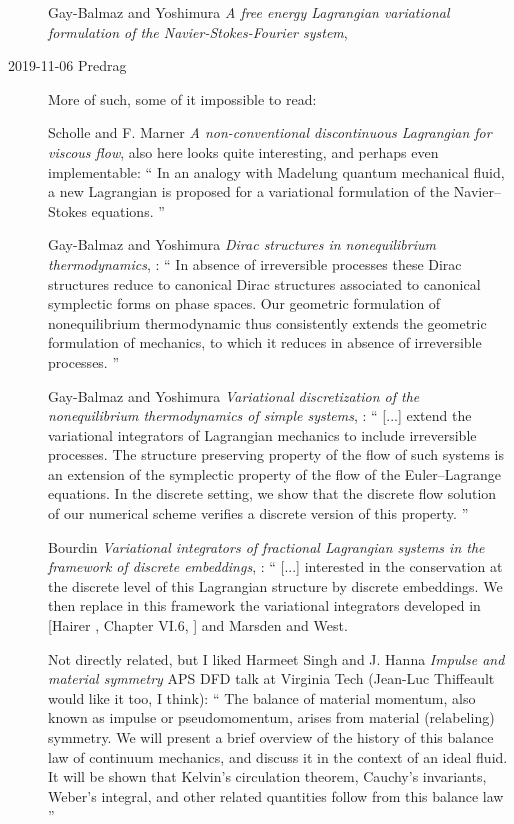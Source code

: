 \begin{description}
Gay-Balmaz and Yoshimura {\em A free energy {Lagrangian}
variational formulation of the {Navier-Stokes-Fourier} system},

\item[2019-11-06 Predrag] More of such, some of it impossible to read:

Scholle and F. Marner
{\em A non-conventional discontinuous {Lagrangian} for viscous flow},
also  {here}
looks quite interesting, and perhaps even implementable: ``
In an analogy with Madelung quantum mechanical fluid, a new Lagrangian is
proposed for a variational formulation of the Navier–Stokes equations.
''


Gay-Balmaz and Yoshimura {\em Dirac structures in nonequilibrium
thermodynamics}, : ``
In absence of irreversible processes these Dirac structures reduce to canonical
Dirac structures associated to canonical symplectic forms on phase spaces. Our
geometric formulation of nonequilibrium thermodynamic thus consistently extends
the geometric formulation of mechanics, to which it reduces in absence of
irreversible processes.
''

Gay-Balmaz and Yoshimura {\em Variational discretization of the
nonequilibrium thermodynamics of simple systems}, : ``
[...] extend the variational integrators of Lagrangian mechanics to include
irreversible processes. The structure preserving property of the flow of such
systems is an extension of the symplectic property of the flow of the
Euler–Lagrange equations. In the discrete setting, we show that the discrete flow
solution of our numerical scheme verifies a discrete version of this property.
''

Bourdin \etal{} {\em Variational integrators of fractional {Lagrangian}
systems in the framework of discrete embeddings},  : ``
[...] interested in the conservation at the discrete level of this Lagrangian
structure by discrete embeddings. We then replace in this framework the
variational integrators developed in [Hairer \etal{}, Chapter VI.6,
] and
Marsden and West.

Not directly related, but
I liked Harmeet Singh and J. Hanna {\em Impulse and material symmetry}
APS DFD talk at Virginia Tech
(Jean-Luc Thiffeault would like it too, I think): ``
The balance of material momentum, also known as impulse or pseudomomentum, arises
from material (relabeling) symmetry. We will present a brief overview of the
history of this balance law of continuum mechanics, and discuss it in the context
of an ideal fluid. It will be shown that Kelvin's circulation theorem, Cauchy's
invariants, Weber's integral, and other related quantities follow from this
balance law
''

\end{description}

